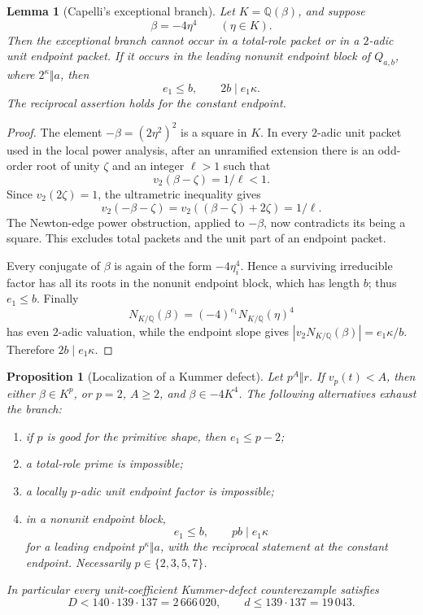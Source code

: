 \documentclass[11pt]{article}
\newtheorem{proposition}[theorem]{Proposition}
\newtheorem{lemma}[theorem]{Lemma}
\theoremstyle{definition}
\newcommand{\Q}{\mathbb Q}
\begin{document}
\begin{lemma}[Capelli's exceptional branch]\label{lem:exceptionalfourth}
Let \(K=\Q(\beta)\), and suppose
\[
 \beta=-4\eta^4\qquad(\eta\in K).
\]
Then the exceptional branch cannot occur in a total-role packet or in a
\(2\)-adic unit endpoint packet.  If it occurs in the leading nonunit
endpoint block of \(Q_{a,b}\), where \(2^\kappa\Vert a\), then
\begin{equation}
 e_1\leq b,\qquad 2b\mid e_1\kappa.
 \tag{19.10}
\end{equation}
The reciprocal assertion holds for the constant endpoint.
\end{lemma}

\begin{proof}
The element \(-\beta=(2\eta^2)^2\) is a square in \(K\).  In every
\(2\)-adic unit packet used in the local power analysis, after an unramified
extension there is an odd-order root of unity \(\zeta\) and an integer
\(\ell>1\) such that
\[
 v_2(\beta-\zeta)=1/\ell<1.
\]
Since \(v_2(2\zeta)=1\), the ultrametric inequality gives
\[
 v_2(-\beta-\zeta)=v_2((\beta-\zeta)+2\zeta)=1/\ell.
\]
The Newton-edge power obstruction, applied to \(-\beta\), now contradicts
its being a square.  This excludes total packets and the unit part of an
endpoint packet.

Every conjugate of \(\beta\) is again of the form \(-4\eta_i^4\).  Hence a
surviving irreducible factor has all its roots in the nonunit endpoint block,
which has length \(b\); thus \(e_1\leq b\).  Finally
\[
 N_{K/\Q}(\beta)=(-4)^{e_1}N_{K/\Q}(\eta)^4
\]
has even \(2\)-adic valuation, while the endpoint slope gives
\(|v_2N_{K/\Q}(\beta)|=e_1\kappa/b\).  Therefore
\(2b\mid e_1\kappa\).
\end{proof}

\begin{proposition}[Localization of a Kummer defect]
\label{prop:defectlocalization}
Let \(p^A\Vert r\).  If \(v_p(t)<A\), then either
\(\beta\in K^p\), or \(p=2\), \(A\geq2\), and
\(\beta\in-4K^4\).  The following alternatives exhaust the branch:
\begin{enumerate}[label=(\alph*)]
\item if \(p\) is good for the primitive shape, then \(e_1\leq p-2\);
\item a total-role prime is impossible;
\item a locally \(p\)-adic unit endpoint factor is impossible;
\item in a nonunit endpoint block,
\[
 e_1\leq b,\qquad pb\mid e_1\kappa
\]
for a leading endpoint \(p^\kappa\Vert a\), with the reciprocal statement
at the constant endpoint.  Necessarily \(p\in\{2,3,5,7\}\).
\end{enumerate}
In particular every unit-coefficient Kummer-defect counterexample satisfies
\begin{equation}
 D<140\cdot139\cdot137=2\,666\,020,
 \qquad d\leq139\cdot137=19\,043.
 \tag{19.11}
\end{equation}
\end{proposition}
\end{document}
